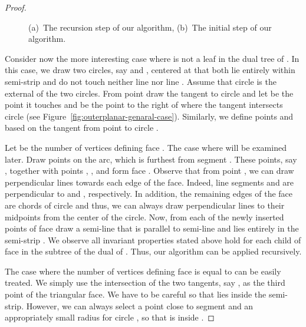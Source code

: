 \documentclass{llncs}
\begin{document}
\begin{proof}
\begin{figure}[h!tb]
  \centering
  \begin{minipage}[b]{.68\textwidth}
     \centering
  \end{minipage}
  \hfill
  \begin{minipage}[b]{.31\textwidth}
     \centering
  \end{minipage}
  \caption{(a)~The recursion step of our algorithm, (b)~The initial step of our algorithm.}
  \label{fig:ata-graph}
\end{figure}

Consider now the more interesting case where  is not a leaf in
the dual tree of . In this case, we draw two circles, say
 and , centered at  that
both lie entirely within semi-strip  and do not touch
neither line  nor line . Assume that circle
 is the external of the two circles. From
point  draw the tangent to circle  and let 
be the point it touches  and  be the
point to the right of  where the tangent intersects circle
 (see
Figure~\ref{fig:outerplanar-genaral-case}). Similarly, we define
points  and  based on the tangent from point  to
circle .

Let  be the number of vertices defining face . The case
where  will be examined later. Draw  points on the
 arc, which is furthest from segment
. These points, say , together
with points , ,  and  form face .
Observe that from point , we can draw perpendicular lines
towards each edge of the face. Indeed, line segments  and
 are perpendicular to  and ,
respectively. In addition, the remaining edges of the face are
chords of circle  and thus, we can always draw
perpendicular lines to their midpoints from the center  of the
circle. Now, from each of the newly inserted points of face  draw
a semi-line that is parallel to semi-line  and lies entirely
in the semi-strip . We observe all invariant properties
stated above hold for each child of face  in the subtree  of
the dual of . Thus, our algorithm can be applied recursively.

The case where the number  of vertices defining face  is equal
to  can be easily treated. We simply use the intersection of the
two tangents, say , as the third point of the triangular face.
We have to be careful so that  lies inside the semi-strip.
However, we can always select a point  close to segment
 and an appropriately small radius for circle
, so that  is inside .



\end{proof}
\end{document}
